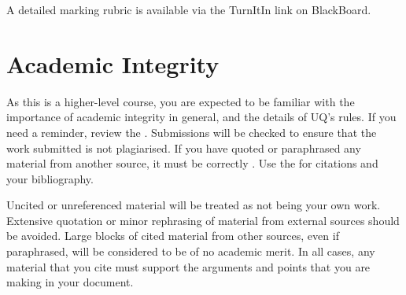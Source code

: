 \documentclass{csse4400}
\begin{document}
\noindent
A detailed marking rubric is available via the TurnItIn link on BlackBoard.


\section{Academic Integrity}
As this is a higher-level course, you are expected to be familiar with the importance of academic integrity in general, and the details of UQ's rules.
If you need a reminder, review the .
Submissions will be checked to ensure that the work submitted is not plagiarised.
If you have quoted or paraphrased any material from another source, it must be correctly .
Use the  for citations and your bibliography.

Uncited or unreferenced material will be treated as not being your own work.
Extensive quotation or minor rephrasing of material from external sources should be avoided.
Large blocks of cited material from other sources, even if paraphrased, will be considered to be of no academic merit.
In all cases, any material that you cite must support the arguments and points that you are making in your document.

%
%
\end{document}
